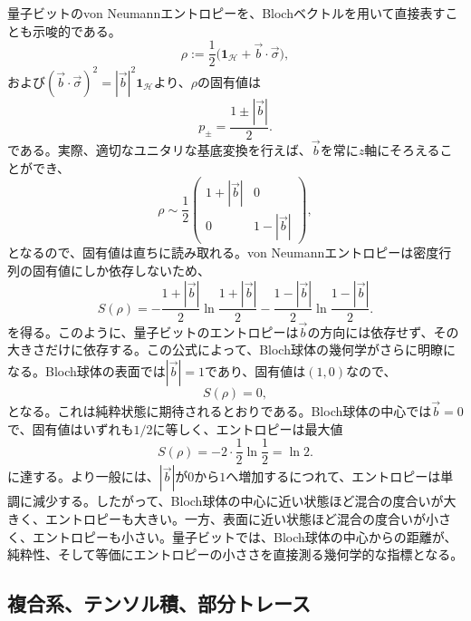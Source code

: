 \documentclass[a4paper,11pt,oneside]{article}
\theoremstyle{definition}
\numberwithin{equation}{section}
\begin{document}
量子ビットのvon Neumannエントロピーを、Blochベクトルを用いて直接表すことも示唆的である。
\begin{equation}
\rho := \frac12 \bigl(\mathbf{1}_{\mathcal H}+\vec b\cdot \vec \sigma\bigr) ,
\end{equation}
および$(\vec b\cdot \vec \sigma)^2 = |\vec b|^2 \mathbf{1}_{\mathcal H}$より、$\rho$の固有値は
\begin{equation}
p_{\pm} = \frac{1 \pm |\vec b|}{2} .
\end{equation}
である。実際、適切なユニタリな基底変換を行えば、$\vec b$を常に$z$軸にそろえることができ、
\begin{equation}
\rho \sim \frac12
\begin{pmatrix}
1+|\vec b| & 0 \\
0 & 1-|\vec b|
\end{pmatrix} ,
\end{equation}
となるので、固有値は直ちに読み取れる。von Neumannエントロピーは密度行列の固有値にしか依存しないため、
\begin{equation}\label{Sqbit}
S(\rho)
=
-\frac{1+|\vec b|}{2}\ln\frac{1+|\vec b|}{2}
-\frac{1-|\vec b|}{2}\ln\frac{1-|\vec b|}{2} .
\end{equation}
を得る。このように、量子ビットのエントロピーは$\vec b$の方向には依存せず、その大きさだけに依存する。この公式によって、Bloch球体の幾何学がさらに明瞭になる。Bloch球体の表面では$|\vec b|=1$であり、固有値は$(1,0)$なので、
\begin{equation}
S(\rho)=0 ,
\end{equation}
となる。これは純粋状態に期待されるとおりである。Bloch球体の中心では$\vec b=0$で、固有値はいずれも$1/2$に等しく、エントロピーは最大値
\begin{equation}
S(\rho)= -2\cdot \frac12 \ln\frac12 = \ln 2 .
\end{equation}
に達する。より一般には、$|\vec b|$が$0$から$1$へ増加するにつれて、エントロピーは単調に減少する。したがって、Bloch球体の中心に近い状態ほど混合の度合いが大きく、エントロピーも大きい。一方、表面に近い状態ほど混合の度合いが小さく、エントロピーも小さい。量子ビットでは、Bloch球体の中心からの距離が、純粋性、そして等価にエントロピーの小ささを直接測る幾何学的な指標となる。

 
 
 

\subsection{複合系、テンソル積、部分トレース}
\end{document}
